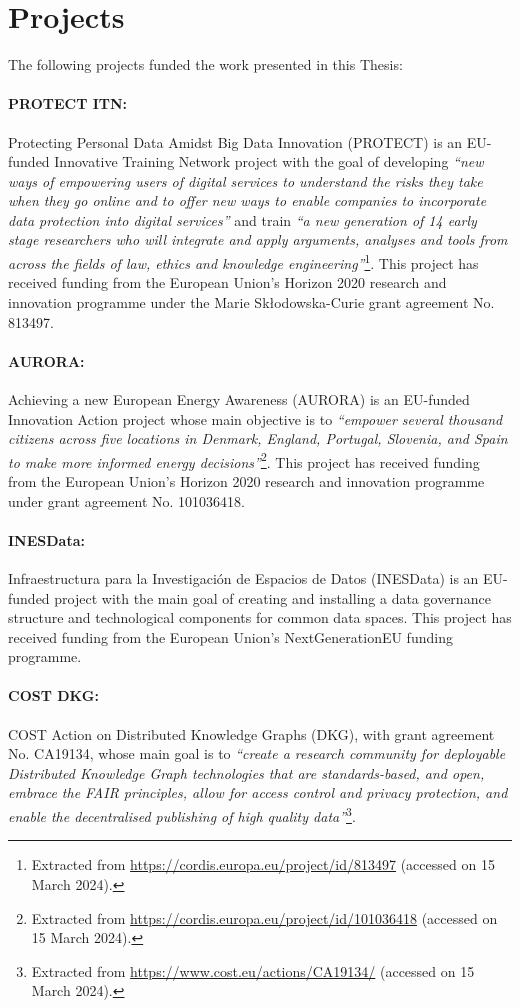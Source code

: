 \section{Projects}
\label{sec:projects}

The following projects funded the work presented in this Thesis:

\paragraph{PROTECT ITN:} Protecting Personal Data Amidst Big Data Innovation (PROTECT) is an EU-funded Innovative Training Network project with the goal of developing \textit{``new ways of empowering users of digital services to understand the risks they take when they go online and to offer new ways to enable companies to incorporate data protection into digital services''} and train \textit{``a new generation of 14 early stage researchers who will integrate and apply arguments, analyses and tools from across the fields of law, ethics and knowledge engineering''}\footnote{Extracted from \url{https://cordis.europa.eu/project/id/813497} (accessed on 15 March 2024).}. This project has received funding from the European Union’s Horizon 2020 research and innovation programme under the Marie Skłodowska-Curie grant agreement No. 813497.

\paragraph{AURORA:} Achieving a new European Energy Awareness (AURORA) is an EU-funded Innovation Action project whose main objective is to \textit{``empower several thousand citizens across five locations in Denmark, England, Portugal, Slovenia, and Spain to make more informed energy decisions''}\footnote{Extracted from \url{https://cordis.europa.eu/project/id/101036418} (accessed on 15 March 2024).}. This project has received funding from the European Union’s Horizon 2020 research and innovation programme under grant agreement No. 101036418.

\paragraph{INESData:} Infraestructura para la Investigación de Espacios de Datos (INESData) is an EU-funded project with the main goal of creating and installing a data governance structure and technological components for common data spaces. This project has received funding from the European Union’s NextGenerationEU funding programme.

\paragraph{COST DKG:} COST Action on Distributed Knowledge Graphs (DKG), with grant agreement No. CA19134, whose main goal is to \textit{``create a research community for deployable Distributed Knowledge Graph technologies that are standards-based, and open, embrace the FAIR principles, allow for access control and privacy protection, and enable the decentralised publishing of high quality data''}\footnote{Extracted from \url{https://www.cost.eu/actions/CA19134/} (accessed on 15 March 2024).}.